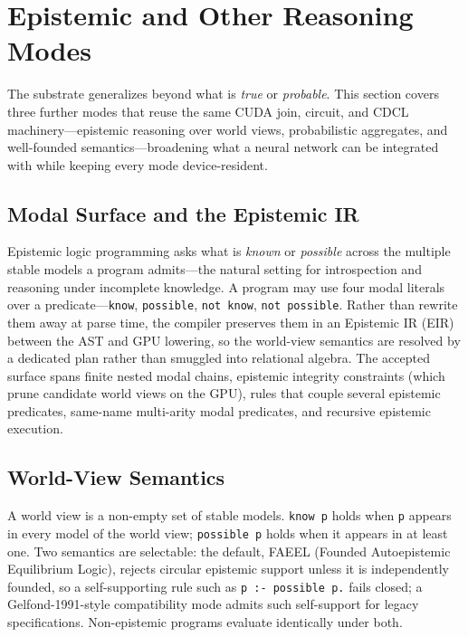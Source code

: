 \section{Epistemic and Other Reasoning Modes}\label{sec:epistemic}

The substrate generalizes beyond what is \emph{true} or \emph{probable}. This section covers three further modes that reuse the same CUDA join, circuit, and CDCL machinery---epistemic reasoning over world views, probabilistic aggregates, and well-founded semantics---broadening what a neural network can be integrated with while keeping every mode device-resident.

\subsection{Modal Surface and the Epistemic IR}

Epistemic logic programming asks what is \emph{known} or \emph{possible} across the multiple stable models a program admits---the natural setting for introspection and reasoning under incomplete knowledge. A program may use four modal literals over a predicate---\texttt{know}, \texttt{possible}, \texttt{not know}, \texttt{not possible}. Rather than rewrite them away at parse time, the compiler preserves them in an Epistemic IR (EIR) between the AST and GPU lowering, so the world-view semantics are resolved by a dedicated plan rather than smuggled into relational algebra. The accepted surface spans finite nested modal chains, epistemic integrity constraints (which prune candidate world views on the GPU), rules that couple several epistemic predicates, same-name multi-arity modal predicates, and recursive epistemic execution.

\subsection{World-View Semantics}

A world view is a non-empty set of stable models. \texttt{know p} holds when \texttt{p} appears in every model of the world view; \texttt{possible p} holds when it appears in at least one. Two semantics are selectable: the default, FAEEL (Founded Autoepistemic Equilibrium Logic), rejects circular epistemic support unless it is independently founded, so a self-supporting rule such as \texttt{p :- possible p.} fails closed; a Gelfond-1991-style compatibility mode admits such self-support for legacy specifications. Non-epistemic programs evaluate identically under both.

